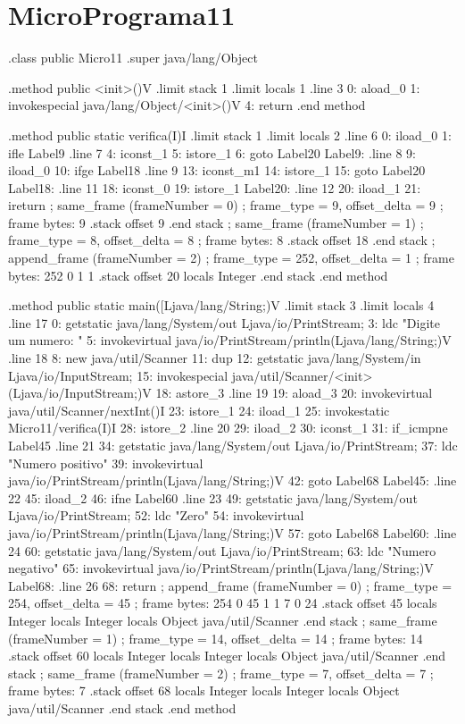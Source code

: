 \documentclass[12pt,a4paper,twoside]{report}
\begin{document}
\section{MicroPrograma11}
\begin{terminal}
.class public Micro11
.super java/lang/Object

.method public <init>()V
  .limit stack 1
  .limit locals 1
  .line 3
  0: aload_0
  1: invokespecial java/lang/Object/<init>()V
  4: return
.end method

.method public static verifica(I)I
  .limit stack 1
  .limit locals 2
  .line 6
  0: iload_0
  1: ifle Label9
  .line 7
  4: iconst_1
  5: istore_1
  6: goto Label20
Label9:
  .line 8
  9: iload_0
  10: ifge Label18
  .line 9
  13: iconst_m1
  14: istore_1
  15: goto Label20
Label18:
  .line 11
  18: iconst_0
  19: istore_1
Label20:
  .line 12
  20: iload_1
  21: ireturn
  ; same_frame (frameNumber = 0)
  ; frame_type = 9, offset_delta = 9
  ; frame bytes: 9
  .stack
    offset 9
    .end stack
  ; same_frame (frameNumber = 1)
  ; frame_type = 8, offset_delta = 8
  ; frame bytes: 8
  .stack
    offset 18
    .end stack
  ; append_frame (frameNumber = 2)
  ; frame_type = 252, offset_delta = 1
  ; frame bytes: 252 0 1 1
  .stack
    offset 20
    locals Integer
    .end stack
.end method

.method public static main([Ljava/lang/String;)V
  .limit stack 3
  .limit locals 4
  .line 17
  0: getstatic java/lang/System/out Ljava/io/PrintStream;
  3: ldc "Digite um numero: "
  5: invokevirtual java/io/PrintStream/println(Ljava/lang/String;)V
  .line 18
  8: new java/util/Scanner
  11: dup
  12: getstatic java/lang/System/in Ljava/io/InputStream;
  15: invokespecial java/util/Scanner/<init>(Ljava/io/InputStream;)V
  18: astore_3
  .line 19
  19: aload_3
  20: invokevirtual java/util/Scanner/nextInt()I
  23: istore_1
  24: iload_1
  25: invokestatic Micro11/verifica(I)I
  28: istore_2
  .line 20
  29: iload_2
  30: iconst_1
  31: if_icmpne Label45
  .line 21
  34: getstatic java/lang/System/out Ljava/io/PrintStream;
  37: ldc "Numero positivo"
  39: invokevirtual java/io/PrintStream/println(Ljava/lang/String;)V
  42: goto Label68
Label45:
  .line 22
  45: iload_2
  46: ifne Label60
  .line 23
  49: getstatic java/lang/System/out Ljava/io/PrintStream;
  52: ldc "Zero"
  54: invokevirtual java/io/PrintStream/println(Ljava/lang/String;)V
  57: goto Label68
Label60:
  .line 24
  60: getstatic java/lang/System/out Ljava/io/PrintStream;
  63: ldc "Numero negativo"
  65: invokevirtual java/io/PrintStream/println(Ljava/lang/String;)V
Label68:
  .line 26
  68: return
  ; append_frame (frameNumber = 0)
  ; frame_type = 254, offset_delta = 45
  ; frame bytes: 254 0 45 1 1 7 0 24
  .stack
    offset 45
    locals Integer
    locals Integer
    locals Object java/util/Scanner
    .end stack
  ; same_frame (frameNumber = 1)
  ; frame_type = 14, offset_delta = 14
  ; frame bytes: 14
  .stack
    offset 60
    locals Integer
    locals Integer
    locals Object java/util/Scanner
    .end stack
  ; same_frame (frameNumber = 2)
  ; frame_type = 7, offset_delta = 7
  ; frame bytes: 7
  .stack
    offset 68
    locals Integer
    locals Integer
    locals Object java/util/Scanner
    .end stack
.end method



\end{terminal}
\end{document}

